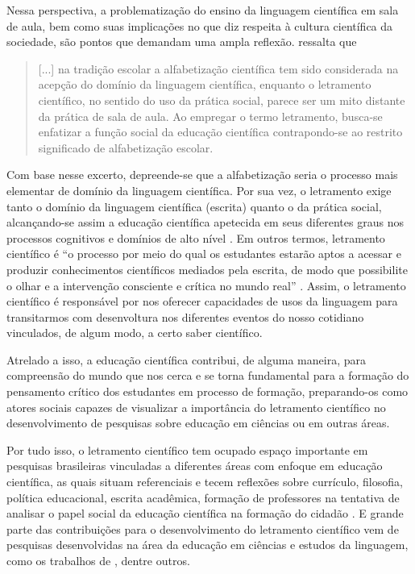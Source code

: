 \documentclass{textolivre}
\begin{document}
Nessa perspectiva, a problematização do ensino da linguagem científica em sala de aula, bem como suas implicações no que diz respeita à cultura científica da sociedade, são pontos que demandam uma ampla reflexão. \textcite[p. 479]{santos_educacao_2007} ressalta que

\begin{quote}
    [...] na tradição escolar a alfabetização científica tem sido considerada na acepção do domínio da linguagem científica, enquanto o letramento científico, no sentido do uso da prática social, parece ser um mito distante da prática de sala de aula. Ao empregar o termo letramento, busca-se enfatizar a função social da educação científica contrapondo-se ao restrito significado de alfabetização escolar. 
\end{quote}

Com base nesse excerto, depreende-se que a alfabetização seria o processo mais elementar de domínio da linguagem científica. Por sua vez, o letramento exige tanto o domínio da linguagem científica (escrita) quanto o da prática social, alcançando-se assim a educação científica apetecida em seus diferentes graus nos processos cognitivos e domínios de alto nível \cite{santos_educacao_2007}. Em outros termos, letramento científico é “o processo por meio do qual os estudantes estarão aptos a acessar e produzir conhecimentos científicos mediados pela escrita, de modo que possibilite o olhar e a intervenção consciente e crítica no mundo real” \cite[p. 7]{silva_ciencia_2018}. Assim, o letramento científico é responsável por nos oferecer capacidades de usos da linguagem para transitarmos com desenvoltura nos diferentes eventos do nosso cotidiano vinculados, de algum modo, a certo saber científico.

Atrelado a isso, a educação científica contribui, de alguma maneira, para compreensão do mundo que nos cerca e se torna fundamental para a formação do pensamento crítico dos estudantes em processo de formação, preparando-os como atores sociais capazes de visualizar a importância do letramento científico no desenvolvimento de pesquisas sobre educação em ciências ou em outras áreas.

Por tudo isso, o letramento científico tem ocupado espaço importante em pesquisas brasileiras vinculadas a diferentes áreas com enfoque em educação científica, as quais situam referenciais e tecem reflexões sobre currículo, filosofia, política educacional, escrita acadêmica, formação de professores na tentativa de analisar o papel social da educação científica na formação do cidadão \cite{santos_educacao_2007}. E grande parte das contribuições para o desenvolvimento do letramento científico vem de pesquisas desenvolvidas na área da educação em ciências e estudos da linguagem, como os trabalhos de \textcite{santos_educacao_2007, motta-roth_letramento_2011, cunha_alfabetizacao_2017, silva_ciencia_2018}, dentre outros.
\end{document}
